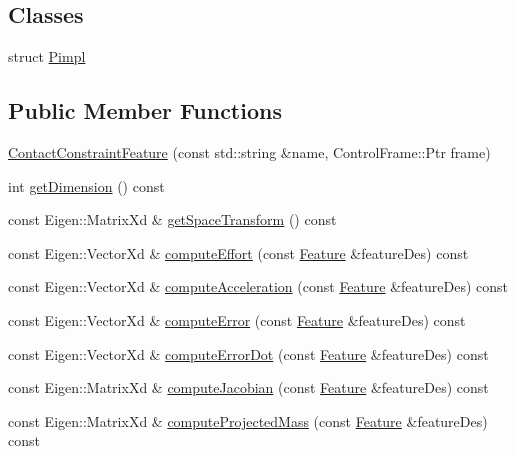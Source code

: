 \subsection*{Classes}
\begin{DoxyCompactItemize}
\item 
struct \hyperlink{structocra_1_1ContactConstraintFeature_1_1Pimpl}{Pimpl}
\end{DoxyCompactItemize}
\subsection*{Public Member Functions}
\begin{DoxyCompactItemize}
\item 
\hyperlink{classocra_1_1ContactConstraintFeature_a2e4c6265bd194309b5e2304260d53bec}{Contact\+Constraint\+Feature} (const std\+::string \&name, Control\+Frame\+::\+Ptr frame)
\item 
int \hyperlink{classocra_1_1ContactConstraintFeature_ac498096b8df524b054f35b05d027f0f0}{get\+Dimension} () const
\item 
const Eigen\+::\+Matrix\+Xd \& \hyperlink{classocra_1_1ContactConstraintFeature_ac7f34721e72544d13e7030182b55f429}{get\+Space\+Transform} () const
\item 
const Eigen\+::\+Vector\+Xd \& \hyperlink{classocra_1_1ContactConstraintFeature_ab545e20b58d45b47a0e2f2a0a64f9c48}{compute\+Effort} (const \hyperlink{classocra_1_1Feature}{Feature} \&feature\+Des) const
\item 
const Eigen\+::\+Vector\+Xd \& \hyperlink{classocra_1_1ContactConstraintFeature_a81aeb9d50b198c49d0868ba8321bcfd7}{compute\+Acceleration} (const \hyperlink{classocra_1_1Feature}{Feature} \&feature\+Des) const
\item 
const Eigen\+::\+Vector\+Xd \& \hyperlink{classocra_1_1ContactConstraintFeature_a2d5b3c766e22c541e416ca52d14e78df}{compute\+Error} (const \hyperlink{classocra_1_1Feature}{Feature} \&feature\+Des) const
\item 
const Eigen\+::\+Vector\+Xd \& \hyperlink{classocra_1_1ContactConstraintFeature_a0be2debba15230d160957c15eb5afa97}{compute\+Error\+Dot} (const \hyperlink{classocra_1_1Feature}{Feature} \&feature\+Des) const
\item 
const Eigen\+::\+Matrix\+Xd \& \hyperlink{classocra_1_1ContactConstraintFeature_a7b0fc26f03104eb02a7ba565b99a41d7}{compute\+Jacobian} (const \hyperlink{classocra_1_1Feature}{Feature} \&feature\+Des) const
\item 
const Eigen\+::\+Matrix\+Xd \& \hyperlink{classocra_1_1ContactConstraintFeature_ac4dec3a5defe2c50e6084d49a1838883}{compute\+Projected\+Mass} (const \hyperlink{classocra_1_1Feature}{Feature} \&feature\+Des) const

\end{DoxyCompactItemize}
